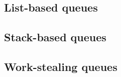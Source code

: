\subsection{List-based queues}







\subsection{Stack-based queues}




\subsection{Work-stealing queues}
\label{sec:ws_queue}




